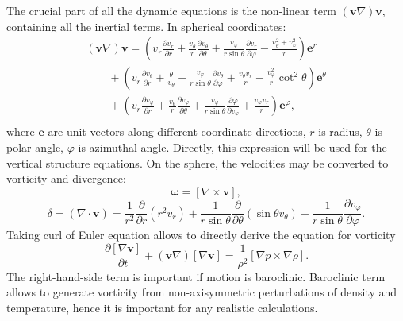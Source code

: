 \documentclass[usenatbib,onecolumn]{mnras}
\renewcommand{\vector}[1]{\ensuremath{\mathbf{#1}}}
\newcommand{\pardir}[2]{\ensuremath{\frac{\partial #2}{\partial #1} }}
\newcommand{\ppardir}[2]{\ensuremath{\frac{\partial }{\partial #1} \left( #2\right)}}
\begin{document}
The crucial part of all the dynamic equations is the non-linear term
$(\vector{v}\nabla) \vector{v}$, containing all the inertial terms. In
spherical coordinates:
\begin{equation}\label{E:vdv}
  \begin{array}{l}
\displaystyle  (\vector{v}\nabla) \vector{v} = \left( v_r \pardir{r}{v_r} +
  \frac{v_\theta}{r} \pardir{\theta}{v_\theta} + \frac{v_\varphi}{r \sin
    \theta} \pardir{\varphi}{v_r} - \frac{v_\theta^2+v_\varphi^2}{r}\right)
  \vector{e}^r  \\
\displaystyle   \qquad{}   + \left( v_r \pardir{r}{v_\theta} + \frac{\theta}{v_\theta} +
  \frac{v_\varphi}{r\sin\theta} \pardir{\varphi}{v_\theta} + \frac{v_\theta
    v_r}{r} - \frac{v_\varphi^2}{r}\cot^2\theta\right) \vector{e}^\theta
   \\
\displaystyle   \qquad{}   +
   \left( v_r \pardir{r}{v_\varphi}  + 
   \frac{v_\theta}{r}\pardir{\theta}{v_\varphi} +
   \frac{v_\varphi}{r\sin\theta}\pardir{v_\varphi}{\varphi} + \frac{v_\varphi
     v_r}{r}\right) \vector{e}^\varphi,\\
   \end{array}
\end{equation}
where $\vector{e}$ are unit vectors along different coordinate directions, $r$
is radius, $\theta$ is polar angle, $\varphi$ is azimuthal
angle. Directly, this expression will be used for the vertical structure
equations. On the sphere, the velocities may be converted to
vorticity  and divergence:
\begin{equation}\label{E:vort}
  \displaystyle   \vector{\omega} = \left[ \nabla \times \vector{v}\right],
\end{equation}
\begin{equation}\label{E:div}
\displaystyle   \delta = (\nabla \cdot \vector{v}) = \frac{1}{r^2}\ppardir{r}{r^2v_r} +
  \frac{1}{r\sin \theta} \ppardir{\theta}{\sin \theta v_\theta} + \frac{1}{r\sin \theta}\pardir{\varphi}{v_\varphi} .
\end{equation}
Taking curl of Euler equation allows to directly derive the equation for
vorticity
\begin{equation}\label{E:Ecurl}
\displaystyle   \pardir{t}{\left[\nabla \vector{v}\right]} +
  (\vector{v}\nabla)\left[\nabla \vector{v}\right] =
  \frac{1}{\rho^2}\left[\nabla p \times \nabla \rho \right].
\end{equation}
The right-hand-side term is important if motion is baroclinic. Baroclinic term
allows to generate vorticity from non-axisymmetric perturbations of density
and temperature, hence it is important for any realistic calculations. 





\label{lastpage}
\end{document}
